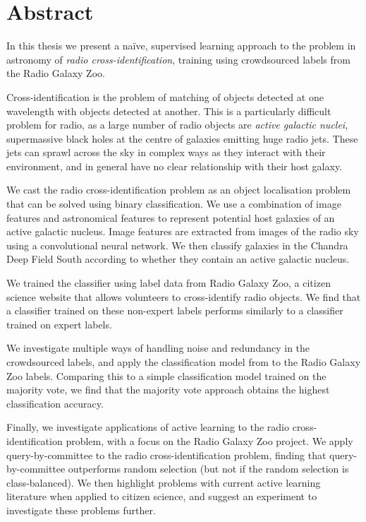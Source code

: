 \chapter*{Abstract}
\label{cha:abstract}

In this thesis we present a na\"ive, supervised learning approach to the problem
in astronomy of \emph{radio cross-identification}, training using crowdsourced
labels from the Radio Galaxy Zoo.

Cross-identification is the problem of matching of objects detected at one
wavelength with objects detected at another. This is a particularly difficult
problem for radio, as a large number of radio objects are \emph{active galactic
nuclei}, supermassive black holes at the centre of galaxies emitting huge radio
jets. These jets can sprawl across the sky in complex ways as they interact with
their environment, and in general have no clear relationship with their host
galaxy.

We cast the radio cross-identification problem as an object localisation problem
that can be solved using binary classification. We use a combination of image
features and astronomical features to represent potential host galaxies of an
active galactic nucleus. Image features are extracted from images of the radio
sky using a convolutional neural network. We then classify galaxies in the
Chandra Deep Field South according to whether they contain an active galactic
nucleus.

We trained the classifier using label data from Radio Galaxy Zoo, a citizen
science website that allows volunteers to cross-identify radio objects. We find
that a classifier trained on these non-expert labels performs similarly to a
classifier trained on expert labels.

We investigate multiple ways of handling noise and redundancy in the
crowdsourced labels, and apply the classification model from \citet{raykar10} to
the Radio Galaxy Zoo labels. Comparing this to a simple classification model
trained on the majority vote, we find that the majority vote approach obtains
the highest classification accuracy.

Finally, we investigate applications of active learning to the radio
cross-identification problem, with a focus on the Radio Galaxy Zoo project. We
apply query-by-committee to the radio cross-identification problem, finding that
query-by-committee outperforms random selection (but not if the random selection
is class-balanced). We then highlight problems with current active learning
literature when applied to citizen science, and suggest an experiment to
investigate these problems further.
